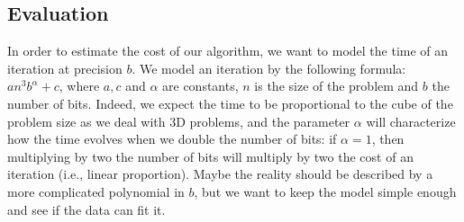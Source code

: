 \subsection{Evaluation}

In order to estimate the cost of our algorithm, we want to model the time of an
iteration at precision $b$. We model an iteration by the following formula:
$an^3b^\alpha+c$, where $a,c$ and $\alpha$ are constants, $n$ is the size of
the problem and $b$ the number of bits. Indeed, we expect the time to be
proportional to the cube of the problem size as we deal with 3D problems, and
the parameter $\alpha$ will characterize how the time evolves when we double
the number of bits: if $\alpha = 1$, then multiplying by two the number of bits
will multiply by two the cost of an iteration (i.e., linear proportion). Maybe
the reality should be described by a more complicated polynomial in $b$, but we
want to keep the model simple enough and see if the data can fit it.


